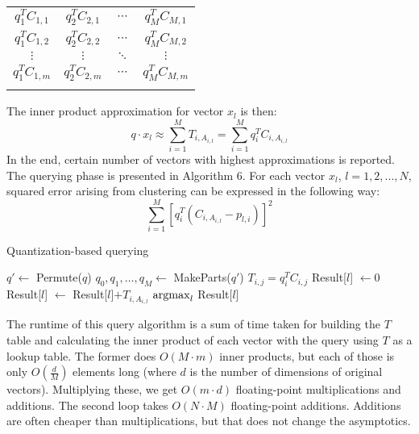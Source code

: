 \renewcommand{\arraystretch}{1.6}
\begin{center}
\begin{tabular}{|c|c|c|c|}
\hhline{----}
$ q_1^T C_{1,1} $ & $ q_2^T C_{2,1} $ & $ \cdots $ & $ q_M^T C_{M,1} $\\
\hhline{----}
$ q_1^T C_{1,2} $ & $ q_2^T C_{2,2} $ & $ \cdots $ & $ q_M^T C_{M,2} $\\
\hhline{----}
$ \vdots $ & $ \vdots $ & $ \ddots $ & $ \vdots $\\
\hhline{----}
$ q_1^T C_{1,m} $ & $ q_2^T C_{2,m} $ & $ \cdots $ & $ q_M^T C_{M,m} $\\
\hhline{----}
\end{tabular}
\end{center}

The inner product approximation for vector $x_l$ is then:
$$q \cdot x_l \approx \sum_{i=1}^{M} T_{i,A_{i,l}} = \sum_{i=1}^{M} q_i^T C_{i,A_{i,l}} $$
In the end, certain number of vectors with highest approximations is reported.
The querying phase is presented in Algorithm 6.
For each vector $x_l$, $l = 1,2,...,N$, squared error arising from clustering can be expressed in the following way:
$$ \sum_{i=1}^{M}  [q_{i}^{T} (C_{i, A_{i,l}} - p_{l,i})]^2$$

\begin{algorithm}
	\caption{Quantization-based querying}
	\begin{algorithmic}
		\State $q' \gets$ Permute($q$)
		\State $q_0, q_1, \dots, q_M \gets$ MakeParts($q'$)
				\State $T_{i,j} = q_i^T C_{i,j}$
			\EndFor
		\EndFor
			\State Result[$l$] $\gets 0$
				\State Result[$l$] $\gets$ Result[$l$]$+ T_{i,A_{i,l}}$
			\EndFor
		\EndFor
		\State \Return $\operatorname*{argmax}_{l}$ Result[$l$]
	\end{algorithmic}
\end{algorithm}

The runtime of this query algorithm is a sum of time taken for building the $T$ table and calculating the inner product of each vector with the query using $T$ as a lookup table.
The former does $O(M \cdot m)$ inner products, but each of those is only $O(\frac{d}{M})$
elements long (where $d$ is the number of dimensions of original vectors). 
Multiplying these, we get $O(m \cdot d)$ floating-point multiplications and additions.
The second loop takes $O(N \cdot M)$ floating-point {additions}. Additions are often
cheaper than multiplications, but that does not change the asymptotics.

